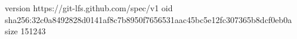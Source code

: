 version https://git-lfs.github.com/spec/v1
oid sha256:32c0a8492828d0141af8c7b8950f7656531aac45bc5e12fc307365b8dcf0eb0a
size 151243
